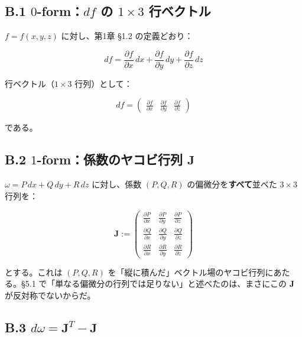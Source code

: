 \documentclass[a4paper,12pt,openany]{book}
\begin{document}
\hypertarget{b.1-0-formdf-ux306e-1-times-3-ux884cux30d9ux30afux30c8ux30eb}{%
\subsection*{\texorpdfstring{B.1 \(0\)-form：\(df\) の \(1 \times 3\)
行ベクトル}{B.1 0-form：df の 1 \textbackslash times 3 行ベクトル}}\label{b.1-0-formdf-ux306e-1-times-3-ux884cux30d9ux30afux30c8ux30eb}}

\(f = f(x,y,z)\) に対し、第1章 §1.2 の定義どおり：

\[df = \frac{\partial f}{\partial x}\,dx + \frac{\partial f}{\partial y}\,dy + \frac{\partial f}{\partial z}\,dz\]

行ベクトル（\(1 \times 3\) 行列）として：

\[df = \begin{pmatrix} \frac{\partial f}{\partial x} & \frac{\partial f}{\partial y} & \frac{\partial f}{\partial z} \end{pmatrix}\]

である。

\hypertarget{b.2-1-formux4fc2ux6570ux306eux30e4ux30b3ux30d3ux884cux5217-mathbfj}{%
\subsection*{\texorpdfstring{B.2 \(1\)-form：係数のヤコビ行列
\(\mathbf{J}\)}{B.2 1-form：係数のヤコビ行列 \textbackslash mathbf\{J\}}}\label{b.2-1-formux4fc2ux6570ux306eux30e4ux30b3ux30d3ux884cux5217-mathbfj}}

\(\omega = P\,dx + Q\,dy + R\,dz\) に対し、係数 \((P,Q,R)\)
の偏微分を\textbf{すべて}並べた \(3 \times 3\) 行列を：

\[\mathbf{J} := \begin{pmatrix}
\frac{\partial P}{\partial x} & \frac{\partial P}{\partial y} & \frac{\partial P}{\partial z} \\
\frac{\partial Q}{\partial x} & \frac{\partial Q}{\partial y} & \frac{\partial Q}{\partial z} \\
\frac{\partial R}{\partial x} & \frac{\partial R}{\partial y} & \frac{\partial R}{\partial z}
\end{pmatrix}\]

とする。これは \((P,Q,R)\)
を「縦に積んだ」ベクトル場のヤコビ行列にあたる。§5.1
で「単なる偏微分の行列では足りない」と述べたのは、まさにこの
\(\mathbf{J}\) が反対称でないからだ。

\hypertarget{b.3-domega-mathbfjt—mathbfj}{%
\subsection*{\texorpdfstring{B.3
\(d\omega = \mathbf{J}^T - \mathbf{J}\)}{B.3 d\textbackslash omega = \textbackslash mathbf\{J\}\^{}T - \textbackslash mathbf\{J\}}}\label{b.3-domega-mathbfjt—mathbfj}}
\end{document}
